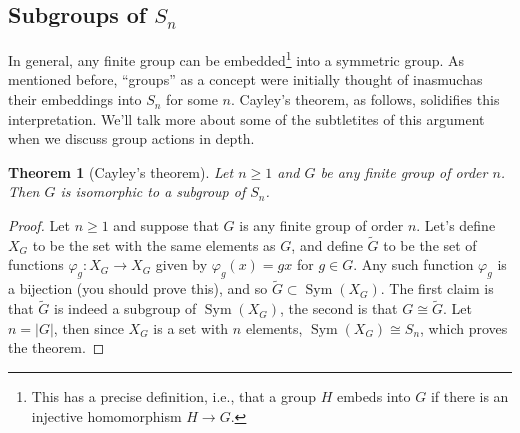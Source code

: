 \documentclass[12pt]{article}
\numberwithin{equation}{subsection}
\newtheorem{thm}[subsection]{Theorem}
\theoremstyle{note}
\newcommand{\Sym}{\operatorname{Sym}}
\begin{document}
\subsection{Subgroups of $S_n$}

In general, any finite group can be embedded\footnote{This has a precise definition, i.e., that a group $H$ embeds into $G$ if there is an injective homomorphism $H\to G$.} into a symmetric group. As mentioned before, ``groups'' as a concept were initially thought of inasmuchas their embeddings into $S_n$ for some $n$. Cayley's theorem, as follows, solidifies this interpretation. We'll talk more about some of the subtletites of this argument when we discuss group actions in depth.


\begin{thm}[Cayley's theorem] 
Let $n\geq 1$ and $G$ be any finite group of order $n$. Then $G$ is isomorphic to a subgroup of $S_n$. 
\end{thm}

\begin{proof}
	Let $n\geq 1$ and suppose that $G$ is any finite group of order $n$. Let's define $X_G$ to be the set with the same elements as $G$, and define  $\widetilde{G}$ to be the set of functions $\varphi_g\colon X_G\to X_G$ given by $\varphi_g(x)=gx$ for $g\in G$. Any such function $\varphi_g$ is a bijection (you should prove this), and  so  $\widetilde{G} \subset \Sym(X_G)$. The first claim is that  $\widetilde{G}$ is indeed a subgroup of $\Sym(X_G)$, the second is that $G\cong  \widetilde{G}$. Let $n=|G|$, then since $X_G$ is a set with $n$ elements, $\Sym(X_G)\cong S_n$, which proves the theorem.
\end{proof}
\end{document}
